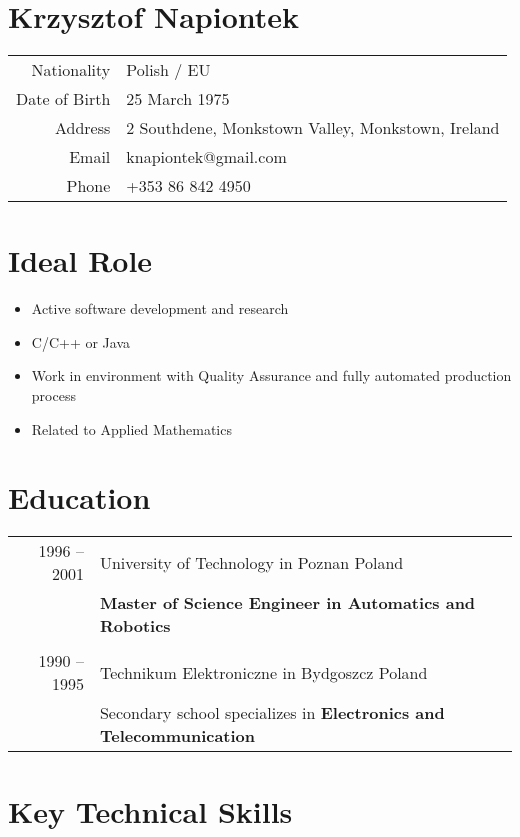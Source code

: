 \documentclass[a4paper,10pt]{article}
\begin{document}
\section*{Krzysztof Napiontek}

\begin{tabular}{r|l}
Nationality & Polish / EU\\
Date of Birth & 25 March 1975\\
Address & 2 Southdene, Monkstown Valley, Monkstown, Ireland\\
Email & knapiontek@gmail.com\\
Phone & +353 86 842 4950
\end{tabular}

\section*{Ideal Role}

\begin{itemize}
\item Active software development and research
\item C/C++ or Java
\item Work in environment with Quality Assurance and fully automated production process
\item Related to Applied Mathematics
\end{itemize}

\section*{Education}

\begin{tabular}{r|l}
1996 -- 2001 & University of Technology in Poznan Poland\\
& \textbf{Master of Science Engineer in Automatics and Robotics}\\\\
1990 -- 1995 & Technikum Elektroniczne in Bydgoszcz Poland\\
& Secondary school specializes in \textbf{Electronics and Telecommunication}
\end{tabular}

\section*{Key Technical Skills}
\end{document}
